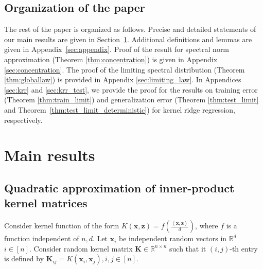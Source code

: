 \documentclass[twoside,11pt]{article}
\newcommand{\inner}[1]{\left\langle #1 \right\rangle}
\newcommand{\R}{\mathbb{R}}
\def\bK{{\boldsymbol K}}
\def\bx{{\boldsymbol x}}
\def\bz{{\boldsymbol z}}
\renewcommand{\bK}{\boldsymbol{K}}
\newcommand{\x}{\boldsymbol{x}}
\newcommand{\1}{\mathbf{1}}
\newcommand{\round}[1]{\left(#1\right)}
\begin{document}
\subsection{Organization of the paper} The rest of the paper is organized as follows. Precise and detailed statements of our main results are given in Section~\ref{section:main_result}. Additional definitions and lemmas are given in Appendix~\ref{sec:appendix}. Proof of the result for spectral norm approximation (Theorem \ref{thm:concentration}) is given in Appendix \ref{sec:concentration}.  The proof of the limiting spectral distribution (Theorem \ref{thm:globallaw}) is provided in Appendix \ref{sec:limiting_law}. In Appendices \ref{sec:krr} and \ref{sec:krr_test}, we provide the proof for the results on training error (Theorem \ref{thm:train_limit}) and generalization error (Theorem \ref{thm:test_limit} and Theorem~\ref{thm:test_limit_deterministic}) for kernel ridge regression, respectively.

\section{Main results}
\label{section:main_result}



\subsection{Quadratic approximation of inner-product kernel matrices}
Consider kernel function of the form $K(\bx,\bz) = f\round{\frac{\inner{\bx,\bz}}{d}}$, where $f$ is a function independent of $n, d$.
 Let $\bx_i$ be independent random vectors in $\mathbb R^d$ $i\in [n]$. Consider random kernel matrix $\bK\in\R^{n\times n}$ such that it $(i,j)$-th entry is defined by  $\bK_{ij} = K(\x_i,\x_j), i,j\in[n]$.
\end{document}
